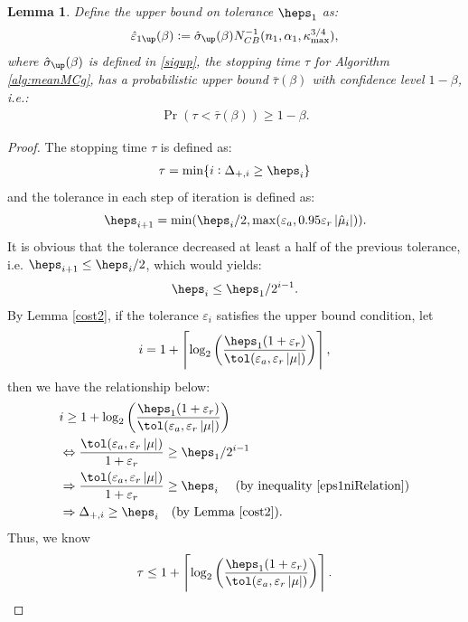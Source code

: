 \documentclass{iitthesis}
\newtheorem{lemma}[theorem]{Lemma}
\begin{document}
\begin{lemma}\label{tauprobbound}
Define the upper bound on tolerance $\heps_1$ as:
\begin{align}\label{eps1updef}
\hvareps_{1\up}(\beta):=\hsigma_{\up}(\beta) N_{CB}^{-1}(n_1,\alpha_1,\kappa_{\max}^{3/4}),
\end{align}
where $\hsigma_{\up}(\beta)$ is defined in \eqref{sigup}, the stopping time $\tau$ for Algorithm \ref{alg:meanMCg}, has a probabilistic upper bound $\bar{\tau}(\beta)$ with confidence level $1-\beta$, i.e.:
\begin{align}
\Pr(\tau <\bar{\tau}(\beta)) \geq 1-\beta.
\end{align}
\end{lemma}
\begin{proof}
The stopping time $\tau$ is defined as:
 \begin{align}\label{st}
\tau = \min \{ i: \Delta_{+,i} \geq \heps_i \}
\end{align}
 and the tolerance in each step of iteration is defined as:
 $$\heps_{i+1} = \min(\heps_i/2, \max(\varepsilon_a,0.95\varepsilon_r\abs{\hmu_i})).$$ 
 It is obvious that the tolerance decreased at least a half of the previous tolerance, i.e.
$\heps_{i+1} \leq\heps_i/2$, which would yields: 
\begin{align}\label{eps1niRelation}
\heps_i \le\heps_1/2^{i-1}.
\end{align} 
By Lemma \ref{cost2}, if the tolerance $\varepsilon_i$ satisfies the upper bound condition, 
let $$i = 1+\left \lceil \log_{2} \left(\frac{\heps_{1}(1+\varepsilon_r)}{ \tol(\varepsilon_a,\varepsilon_r \abs{\mu})}\right) \right \rceil, $$
then we have the relationship below:
\begin{align}
& i \geq 1+\log_{2} \left(\frac{\heps_{1}(1+\varepsilon_r)}{ \tol(\varepsilon_a,\varepsilon_r \abs{\mu})}\right)\\&
\Leftrightarrow  \frac{\tol(\varepsilon_a, \varepsilon_r\abs{\mu})}{1+\varepsilon_r} \ge \heps_1/2^{i-1}\\
& \Rightarrow \frac{\tol(\varepsilon_a, \varepsilon_r\abs{\mu})}{1+\varepsilon_r} \ge \heps_i  \text{ \quad (by inequality \eqref{eps1niRelation}})\\&
\Rightarrow \Delta_{+, i} \ge \heps_{i} \text{\quad(by Lemma \ref{cost2})}.
\end{align}
Thus, we know
\begin{align}\label{taurel}
\tau \le  1+\left \lceil \log_{2} \left(\frac{\heps_{1}(1+\varepsilon_r)}{ \tol(\varepsilon_a,\varepsilon_r \abs{\mu})}\right) \right \rceil.

\end{align}
\end{proof}
\end{document}
